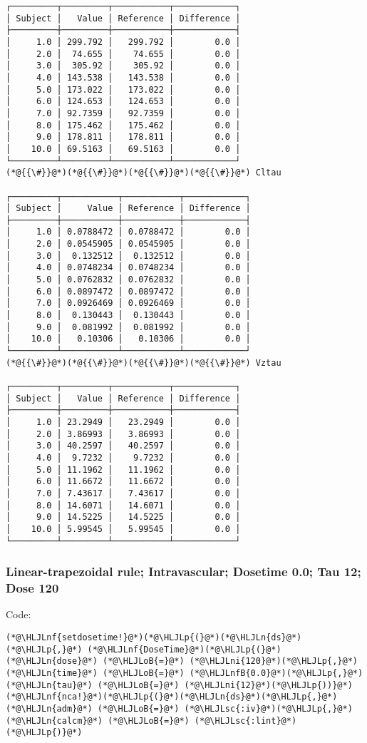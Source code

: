 \documentclass[12pt,a4paper]{article}
\newcommand{\HLJLn}[1]{#1}
\newcommand{\HLJLnf}[1]{\textcolor[RGB]{66,102,213}{#1}}
\newcommand{\HLJLsc}[1]{\textcolor[RGB]{201,61,57}{#1}}
\newcommand{\HLJLnfB}[1]{\textcolor[RGB]{59,151,46}{#1}}
\newcommand{\HLJLni}[1]{\textcolor[RGB]{59,151,46}{#1}}
\newcommand{\HLJLoB}[1]{\textcolor[RGB]{102,102,102}{\textbf{#1}}}
\newcommand{\HLJLp}[1]{#1}
\begin{document}
\begin{lstlisting}
┌─────────┬─────────┬───────────┬────────────┐
│ Subject │   Value │ Reference │ Difference │
├─────────┼─────────┼───────────┼────────────┤
│     1.0 │ 299.792 │   299.792 │        0.0 │
│     2.0 │  74.655 │    74.655 │        0.0 │
│     3.0 │  305.92 │    305.92 │        0.0 │
│     4.0 │ 143.538 │   143.538 │        0.0 │
│     5.0 │ 173.022 │   173.022 │        0.0 │
│     6.0 │ 124.653 │   124.653 │        0.0 │
│     7.0 │ 92.7359 │   92.7359 │        0.0 │
│     8.0 │ 175.462 │   175.462 │        0.0 │
│     9.0 │ 178.811 │   178.811 │        0.0 │
│    10.0 │ 69.5163 │   69.5163 │        0.0 │
└─────────┴─────────┴───────────┴────────────┘
(*@{{\#}}@*)(*@{{\#}}@*)(*@{{\#}}@*)(*@{{\#}}@*) Cltau

┌─────────┬───────────┬───────────┬────────────┐
│ Subject │     Value │ Reference │ Difference │
├─────────┼───────────┼───────────┼────────────┤
│     1.0 │ 0.0788472 │ 0.0788472 │        0.0 │
│     2.0 │ 0.0545905 │ 0.0545905 │        0.0 │
│     3.0 │  0.132512 │  0.132512 │        0.0 │
│     4.0 │ 0.0748234 │ 0.0748234 │        0.0 │
│     5.0 │ 0.0762832 │ 0.0762832 │        0.0 │
│     6.0 │ 0.0897472 │ 0.0897472 │        0.0 │
│     7.0 │ 0.0926469 │ 0.0926469 │        0.0 │
│     8.0 │  0.130443 │  0.130443 │        0.0 │
│     9.0 │  0.081992 │  0.081992 │        0.0 │
│    10.0 │   0.10306 │   0.10306 │        0.0 │
└─────────┴───────────┴───────────┴────────────┘
(*@{{\#}}@*)(*@{{\#}}@*)(*@{{\#}}@*)(*@{{\#}}@*) Vztau

┌─────────┬─────────┬───────────┬────────────┐
│ Subject │   Value │ Reference │ Difference │
├─────────┼─────────┼───────────┼────────────┤
│     1.0 │ 23.2949 │   23.2949 │        0.0 │
│     2.0 │ 3.86993 │   3.86993 │        0.0 │
│     3.0 │ 40.2597 │   40.2597 │        0.0 │
│     4.0 │  9.7232 │    9.7232 │        0.0 │
│     5.0 │ 11.1962 │   11.1962 │        0.0 │
│     6.0 │ 11.6672 │   11.6672 │        0.0 │
│     7.0 │ 7.43617 │   7.43617 │        0.0 │
│     8.0 │ 14.6071 │   14.6071 │        0.0 │
│     9.0 │ 14.5225 │   14.5225 │        0.0 │
│    10.0 │ 5.99545 │   5.99545 │        0.0 │
└─────────┴─────────┴───────────┴────────────┘
\end{lstlisting}


\subsubsection{Linear-trapezoidal rule; Intravascular; Dosetime 0.0; Tau 12; Dose 120}
Code:


\begin{lstlisting}
(*@\HLJLnf{setdosetime!}@*)(*@\HLJLp{(}@*)(*@\HLJLn{ds}@*)(*@\HLJLp{,}@*) (*@\HLJLnf{DoseTime}@*)(*@\HLJLp{(}@*)(*@\HLJLn{dose}@*) (*@\HLJLoB{=}@*) (*@\HLJLni{120}@*)(*@\HLJLp{,}@*) (*@\HLJLn{time}@*) (*@\HLJLoB{=}@*) (*@\HLJLnfB{0.0}@*)(*@\HLJLp{,}@*) (*@\HLJLn{tau}@*) (*@\HLJLoB{=}@*) (*@\HLJLni{12}@*)(*@\HLJLp{))}@*)
(*@\HLJLnf{nca!}@*)(*@\HLJLp{(}@*)(*@\HLJLn{ds}@*)(*@\HLJLp{,}@*) (*@\HLJLn{adm}@*) (*@\HLJLoB{=}@*) (*@\HLJLsc{:iv}@*)(*@\HLJLp{,}@*) (*@\HLJLn{calcm}@*) (*@\HLJLoB{=}@*) (*@\HLJLsc{:lint}@*)(*@\HLJLp{)}@*)
\end{lstlisting}
\end{document}
